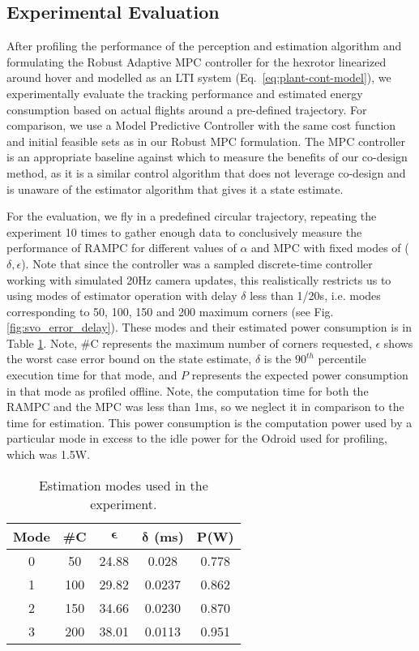 \subsection{Experimental Evaluation}
\label{sec:exp_eval}
After profiling the performance of the perception and estimation algorithm and formulating the Robust Adaptive MPC controller for the hexrotor linearized around hover and modelled as an LTI system (Eq.~\ref{eq:plant-cont-model}), we experimentally evaluate the tracking performance and estimated energy consumption based on actual flights around a pre-defined trajectory. 
For comparison, we use a Model Predictive Controller with the same cost function and initial feasible sets as in our Robust MPC formulation. 
The MPC controller is an appropriate baseline against which to measure the benefits of our co-design method, as it is a similar control algorithm that does not leverage co-design and is unaware of the estimator algorithm that gives it a state estimate. 

For the evaluation, we fly in a predefined circular trajectory, repeating the experiment 10 times to gather enough data to conclusively measure the performance of RAMPC for different values of $\alpha$ and MPC with fixed modes of ($\delta,\epsilon$). 
Note that since the controller was a sampled discrete-time controller working with simulated 20Hz camera updates, this realistically restricts us to using modes of estimator operation with delay $\delta$ less than 1/20s, i.e. modes corresponding to 50, 100, 150 and 200 maximum corners (see Fig. \ref{fig:svo_error_delay}). 
These modes and their estimated power consumption is in Table \ref{tbl:modes_exp}. 
Note, \#C represents the maximum number of corners requested, $\epsilon$ shows the worst case error bound on the state estimate, $\delta$ is the $90^{th}$ percentile execution time for that mode, and $P$ represents the expected power consumption in that mode as profiled offline. Note, the computation time for both the RAMPC and the MPC was less than 1ms, so we neglect it in comparison to the time for estimation.
This power consumption is the computation power used by a particular mode in excess to the idle power for the Odroid used for profiling, which was 1.5W.

\begin{table}[htb]
\begin{center}
\caption{Estimation modes used in the experiment.}
\label{tbl:modes_exp}
\begin{tabular} {|c|c|c|c|c|}
	\hline
	\textbf{Mode} & \textbf{\#C} & $\pmb{\epsilon}$ & $\pmb{\delta}$ \textbf{(ms)} & $\pmb{P}$\textbf{(W)} \\ \hline
	0 & 50 &  24.88 & 0.028 &  0.778  \\ \hline
 	1 & 100 & 29.82 & 0.0237 &  0.862  \\ \hline
	2 & 150 & 34.66 & 0.0230 & 0.870 \\ \hline
	3 & 200 & 38.01 & 0.0113 & 0.951 \\ \hline
	\end{tabular}	
	\end{center}
	\vspace{-10pt}
\end{table}


